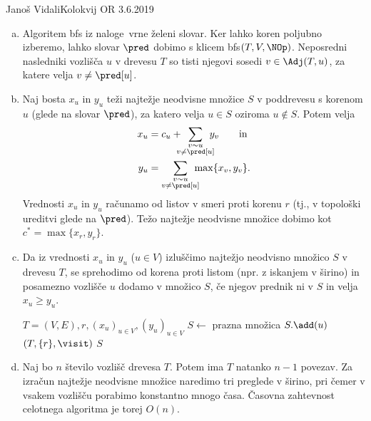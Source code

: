 \begin{naloga}{Janoš Vidali}{Kolokvij OR 3.6.2019}
\begin{odgovor}
\begin{enumerate}[(a)]
\item Algoritem {\sc bfs} iz naloge~\res[bfs] vrne želeni slovar.
Ker lahko koren poljubno izberemo,
lahko slovar $\pred$ dobimo s klicem {\sc bfs}$(T, V, \NOp)$.
Neposredni nasledniki vozlišča $u$ v drevesu $T$
so tisti njegovi sosedi $v \in \Adj(T, u)$,
za katere velja $v \ne \pred[u]$.

\item Naj bosta $x_u$ in $y_u$ teži najtežje neodvisne množice $S$
v poddrevesu s korenom $u$ (glede na slovar $\pred$),
za katero velja $u \in S$ oziroma $u \not\in S$.
Potem velja
\begin{align*}
x_u &= c_u + \!\!\!\!\sum_{\substack{v \sim u \\ v \ne \pred[u]}}\!\!\!\! y_v
\qquad \text{in} \\
y_u &= \sum_{\substack{v \sim u \\ v \ne \pred[u]}}\!\!\!\! \max\{x_v, y_v\} .
\end{align*}
Vrednosti $x_u$ in $y_u$ računamo od listov v smeri proti korenu $r$
(tj., v topološki ureditvi glede na $\pred$).
Težo najtežje neodvisne množice dobimo kot $c^* = \max\{x_r, y_r\}$.

\item Da iz vrednosti $x_u$ in $y_u$ ($u \in V$)
izluščimo najtežjo neodvisno množico $S$ v drevesu $T$,
se sprehodimo od korena proti listom (npr. z iskanjem v širino)
in posamezno vozlišče $u$ dodamo v množico $S$,
če njegov prednik ni v $S$ in velja $x_u \ge y_u$.
\begin{small}
\begin{algorithmic}
%
        {$T = (V, E), r, (x_u)_{u \in V}, (y_u)_{u \in V}$}
    \State $S \gets$ prazna množica
            \State $S.\add(u)$
        \EndIf
    \EndFunction
    $(T, \{r\}, \visit)$
    \State \Return $S$
\EndFunction
\end{algorithmic}
\end{small}

\item Naj bo $n$ število vozlišč drevesa $T$.
Potem ima $T$ natanko $n-1$ povezav.
Za izračun najtežje neodvisne množice naredimo tri preglede v širino,
pri čemer v vsakem vozlišču porabimo konstantno mnogo časa.
Časovna zahtevnost celotnega algoritma je torej $O(n)$.


\end{enumerate}
\end{odgovor}
\end{naloga}
